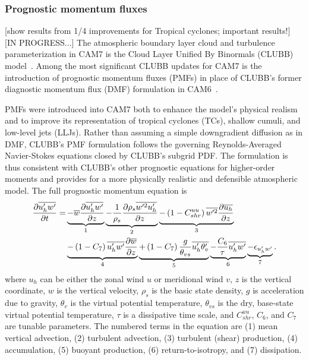 \documentclass[draft]{agujournal2019}
\begin{document}
\subsubsection{Prognostic momentum fluxes}
[show results from 1/4 improvements for Tropical cyclones; important results!]
[IN PROGRESS...] The atmospheric boundary layer cloud and turbulence parameterization in CAM7 is the Cloud Layer Unified By Binormals (CLUBB) model~\cite{Golaz:2002,Larson:2022}. Among the most significant CLUBB updates for CAM7 is the introduction of prognostic momentum fluxes (PMFs) in place of CLUBB’s former diagnostic momentum flux (DMF) formulation in CAM6~\cite{Larson:2019}. 

PMFs were introduced into CAM7 both to enhance the model’s physical realism and to improve its representation of tropical cyclones (TCs), shallow cumuli, and low-level jets (LLJs). Rather than assuming a simple downgradient diffusion as in DMF, CLUBB’s PMF formulation follows the governing Reynolds-Averaged Navier-Stokes equations closed by CLUBB’s subgrid PDF. The formulation is thus consistent with CLUBB’s other prognostic equations for higher-order moments and provides for a more physically realistic and defensible atmospheric model. The full prognostic momentum equation is
\begin{align}
    \frac{\partial\overline{u_h'w'}}{\partial t}=&\underbrace{-\overline w\frac{\partial\overline{u_h'w'}}{\partial z}}_{1}\underbrace{-\frac1{\rho_s}\frac{\partial\rho_s\overline{w'^2u_h'}}{\partial z}}_2\underbrace{-\left(1-C^{uu}_{shr}\right)\overline{w'^2}\frac{\partial\overline{u_h}}{\partial z}}_3 \notag\\
    &\underbrace{-\left(1-C_7\right)\overline{u_h'w'}\frac{\partial\overline w}{\partial z}}_4\underbrace{+\left(1-C_7\right)\frac g{\theta_{vs}}\overline{u_h'\theta_v'}}_5\underbrace{-\frac{C_6}{\tau}\overline{u_h'w'}}_6\underbrace{-\epsilon_{u_h'w'}}_7.
\label{eq:progmomflux}
\end{align}
where $u_h$ can be either the zonal wind $u$ or meridional wind $v$, $z$ is the vertical coordinate, $w$ is the vertical velocity, $\rho_s$ is the basic state density, $g$ is acceleration due to gravity, $\theta_v$ is the virtual potential temperature, $\theta_{vs}$ is the dry, base-state virtual potential temperature, $\tau$ is a dissipative time scale, and $C^{uu}_{shr}$, $C_6$, and $C_7$ are tunable parameters. The numbered terms in the equation are (1) mean vertical advection, (2) turbulent advection, (3) turbulent (shear) production, (4) accumulation, (5) buoyant production, (6) return-to-isotropy, and (7) dissipation.
\end{document}
